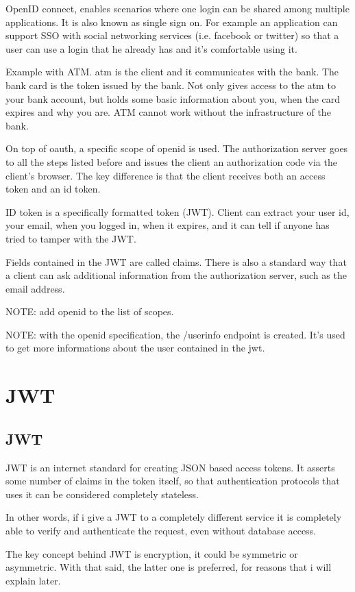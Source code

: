 \documentclass[11pt]{style}
\begin{document}
OpenID connect, enables scenarios where one login can be shared among multiple
applications. It is also known as single sign on.
For example an application can support SSO with social networking services (i.e.
facebook or twitter) so that a user can use a login that he already has and it's
comfortable using it.

Example with ATM. atm is the client and it communicates with the bank. The bank
card is the token issued by the bank. Not only gives access to the atm to your
bank account, but holds some basic information about you, when the card expires
and why you are.
ATM cannot work without the infrastructure of the bank.

On top of oauth, a specific scope of openid is used. The authorization server
goes to all the steps listed before and issues the client an authorization code
via the client's browser.
The key difference is that the client receives both an access token and an id
token.

ID token is a specifically formatted token (JWT). Client can extract your user
id, your email, when you logged in, when it expires, and it can tell if anyone
has tried to tamper with the JWT.

Fields contained in the JWT are called claims.
There is also a standard way that a client can ask additional information from the
authorization server, such as the email address.

NOTE: add openid to the list of scopes.

NOTE: with the openid specification, the /userinfo endpoint is created.
It's used to get more informations about the user contained in the jwt.
\section{JWT}
\label{jwt}
\subsection{JWT}
JWT is an internet standard for creating JSON based access tokens. It asserts
some number of claims in the token itself, so that authentication protocols that
uses it can be considered completely stateless.

In other words, if i give a JWT to a completely different service
it is completely able to verify and authenticate the request, even without
database access.

The key concept behind JWT is encryption, it could be symmetric or asymmetric.
With that said, the latter one is preferred, for reasons that i will explain
later.
\end{document}
